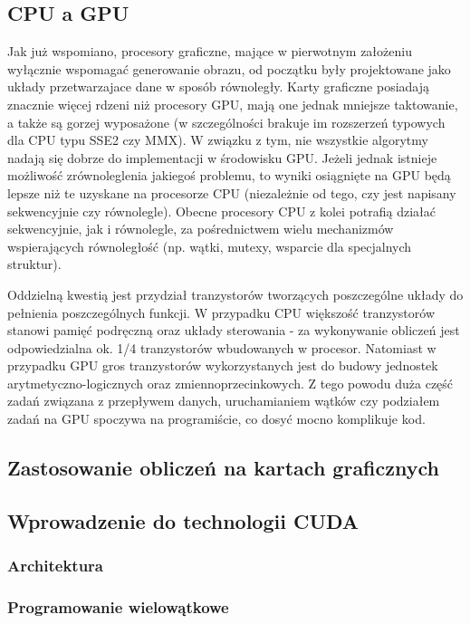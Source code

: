 \documentclass[12pt]{article}
\begin{document}
\subsection{CPU a GPU}

Jak już wspomiano, procesory graficzne, mające w pierwotnym założeniu wyłącznie wspomagać generowanie obrazu, od początku były projektowane jako układy przetwarzajace dane w sposób równoległy. Karty graficzne posiadają znacznie więcej rdzeni niż procesory GPU, mają one jednak mniejsze taktowanie, a także są gorzej wyposażone (w szczególności brakuje im rozszerzeń typowych dla CPU typu SSE2 czy MMX). W związku z tym, nie wszystkie algorytmy nadają się dobrze do implementacji w środowisku GPU. Jeżeli jednak istnieje możliwość zrównoleglenia jakiegoś problemu, to wyniki osiągnięte na GPU będą lepsze niż te uzyskane na procesorze CPU (niezależnie od tego, czy jest napisany sekwencyjnie czy równolegle). Obecne procesory CPU z kolei potrafią działać sekwencyjnie, jak i równolegle, za pośrednictwem wielu mechanizmów wspierających równoległość (np. wątki, mutexy, wsparcie dla specjalnych struktur).

Oddzielną kwestią jest przydział tranzystorów tworzących poszczególne układy do pełnienia poszczególnych funkcji. W przypadku CPU większość tranzystorów stanowi pamięć podręczną oraz układy sterowania - za wykonywanie obliczeń jest odpowiedzialna ok. 1/4 tranzystorów wbudowanych w procesor. Natomiast w przypadku GPU gros tranzystorów wykorzystanych jest do budowy jednostek arytmetyczno-logicznych oraz zmiennoprzecinkowych. Z tego powodu duża część zadań związana z przepływem danych, uruchamianiem wątków czy podziałem zadań na GPU spoczywa na programiście, co dosyć mocno komplikuje kod.

\subsection{Zastosowanie obliczeń na kartach graficznych}


\subsection{Wprowadzenie do technologii CUDA}

\subsubsection{Architektura}

\subsubsection{Programowanie wielowątkowe}
\end{document}
